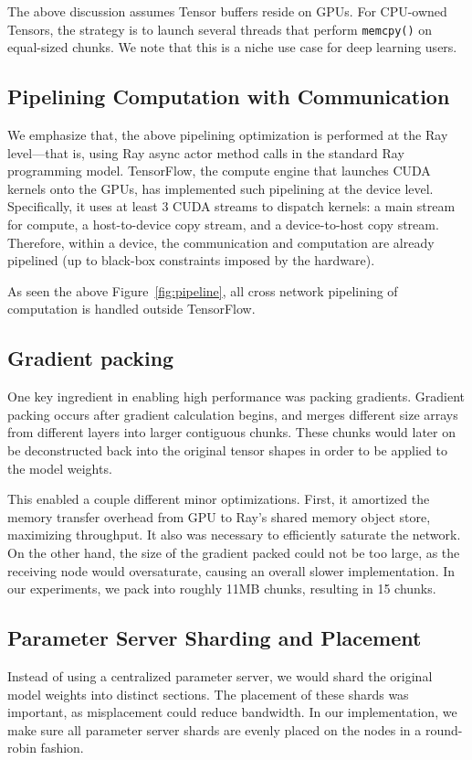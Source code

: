 The above discussion assumes Tensor buffers reside on GPUs.  For CPU-owned Tensors, the strategy is to launch several threads that perform \texttt{memcpy()} on equal-sized chunks.  We note that this is a niche use case for deep learning users.

\subsection{Pipelining Computation with Communication}

We emphasize that, the above pipelining optimization is performed at the Ray level---that is, using Ray async actor method calls in the standard Ray programming model.  TensorFlow, the compute engine that launches CUDA kernels onto the GPUs, has implemented such pipelining at the device level.  Specifically, it uses at least 3 CUDA streams to dispatch kernels: a main stream for compute, a host-to-device copy stream, and a device-to-host copy stream.  Therefore, within a device, the communication and computation are already pipelined (up to black-box constraints imposed by the hardware).


As seen the above Figure~\ref{fig:pipeline}, all cross network pipelining of computation is handled outside TensorFlow.

\subsection{Gradient packing}
One key ingredient in enabling high performance was packing gradients. Gradient packing occurs after gradient calculation begins, and merges different size arrays from different layers into larger contiguous chunks. These chunks would later on be deconstructed back into the original tensor shapes in order to be applied to the model weights.

This enabled a couple different minor optimizations. First, it amortized the memory transfer overhead from GPU to Ray's shared memory object store, maximizing throughput. It also was necessary to efficiently saturate the network. On the other hand, the size of the gradient packed could not be too large, as the receiving node would oversaturate, causing an overall slower implementation. In our experiments, we pack into roughly 11MB chunks, resulting in 15 chunks.

\subsection{Parameter Server Sharding and Placement}
Instead of using a centralized parameter server, we would shard the original model weights into distinct sections. The placement of these shards was important, as misplacement could reduce bandwidth. In our implementation, we make sure all parameter server shards are evenly placed on the nodes in a round-robin fashion.

